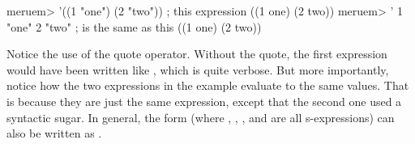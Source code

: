 \begin{REPL}
meruem> '((1 "one") (2 "two"))  ; this expression
((1 one) (2 two))
meruem> '{ 1 "one" 2 "two" }  ; is the same as this
((1 one) (2 two))
\end{REPL}

Notice the use of the quote operator. Without the quote, the first expression would have been written like , which is quite verbose. But more importantly, notice how the two expressions in the example evaluate to the same values. That is because they are just the same expression, except that the second one used a syntactic sugar. In general, the form  (where , , , and  are all s-expressions) can also be written as .